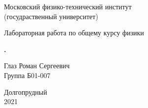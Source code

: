 

\begin{titlepage}

    \newpage
    \begin{center}
        \normalsize Московский физико-технический институт \\
                         (госудраственный университет)
    \end{center}

    \vspace{6em}

    \begin{center}
        \Large Лабораторная работа по общему курсу физики \\
        \labTopic
    \end{center}

    \vspace{1em}

    \begin{center}
        \Large \textbf{\labNumber. \labName}
    \end{center}

    \vspace{2em}

    \begin{center}
        \large Глаз Роман Сергеевич\\
               Группа Б01-007
    \end{center}

    \vspace{\fill}

    \begin{center}
        Долгопрудный \\
            2021
    \end{center}
    
\end{titlepage}


    \pagestyle{fancy}
    \fancyhead{}
    \fancyhead[L]{\labNumber}
    \fancyfoot[C]{\thepage}
